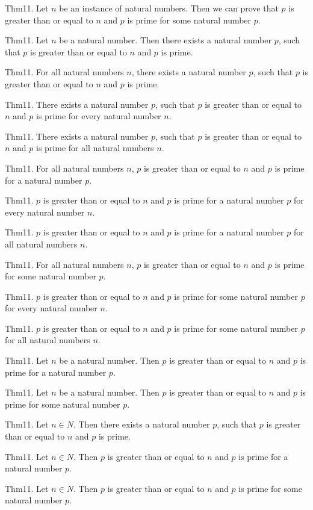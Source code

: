 \documentclass{article}
\begin{document}
Thm11. Let $n$ be an instance of natural numbers. Then we can prove that $p$ is greater than or equal to $n$ and $p$ is prime for some natural number $p$.

Thm11. Let $n$ be a natural number. Then there exists a natural number $p$, such that $p$ is greater than or equal to $n$ and $p$ is prime.

Thm11. For all natural numbers $n$, there exists a natural number $p$, such that $p$ is greater than or equal to $n$ and $p$ is prime.

Thm11. There exists a natural number $p$, such that $p$ is greater than or equal to $n$ and $p$ is prime for every natural number $n$.

Thm11. There exists a natural number $p$, such that $p$ is greater than or equal to $n$ and $p$ is prime for all natural numbers $n$.

Thm11. For all natural numbers $n$, $p$ is greater than or equal to $n$ and $p$ is prime for a natural number $p$.

Thm11. $p$ is greater than or equal to $n$ and $p$ is prime for a natural number $p$ for every natural number $n$.

Thm11. $p$ is greater than or equal to $n$ and $p$ is prime for a natural number $p$ for all natural numbers $n$.

Thm11. For all natural numbers $n$, $p$ is greater than or equal to $n$ and $p$ is prime for some natural number $p$.

Thm11. $p$ is greater than or equal to $n$ and $p$ is prime for some natural number $p$ for every natural number $n$.

Thm11. $p$ is greater than or equal to $n$ and $p$ is prime for some natural number $p$ for all natural numbers $n$.

Thm11. Let $n$ be a natural number. Then $p$ is greater than or equal to $n$ and $p$ is prime for a natural number $p$.

Thm11. Let $n$ be a natural number. Then $p$ is greater than or equal to $n$ and $p$ is prime for some natural number $p$.

Thm11. Let $n \in N$. Then there exists a natural number $p$, such that $p$ is greater than or equal to $n$ and $p$ is prime.

Thm11. Let $n \in N$. Then $p$ is greater than or equal to $n$ and $p$ is prime for a natural number $p$.

Thm11. Let $n \in N$. Then $p$ is greater than or equal to $n$ and $p$ is prime for some natural number $p$.
\end{document}
